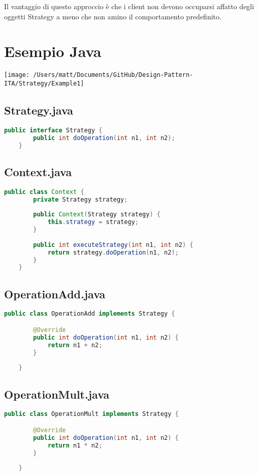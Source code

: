 Il vantaggio di questo approccio è che i client non devono occuparsi affatto degli oggetti Strategy a meno che non amino il comportamento predefinito.


\section{Esempio Java}
\texttt{[image: /Users/matt/Documents/GitHub/Design-Pattern-ITA/Strategy/Example1]}

\subsection{Strategy.java}
\begin{lstlisting}[language=java]
    public interface Strategy {
        public int doOperation(int n1, int n2);
    }
\end{lstlisting}

\subsection{Context.java}
\begin{lstlisting}[language=java]
    public class Context {
        private Strategy strategy;
    
        public Context(Strategy strategy) {
            this.strategy = strategy;
        }
    
        public int executeStrategy(int n1, int n2) {
            return strategy.doOperation(n1, n2);
        }
    }
\end{lstlisting}

\subsection{OperationAdd.java}
\begin{lstlisting}[language=java]
    public class OperationAdd implements Strategy {

        @Override
        public int doOperation(int n1, int n2) {
            return n1 + n2;
        }
        
    }
\end{lstlisting}

\subsection{OperationMult.java}
\begin{lstlisting}[language=java]
    public class OperationMult implements Strategy {

        @Override
        public int doOperation(int n1, int n2) {
            return n1 * n2;
        }
        
    }
\end{lstlisting}

